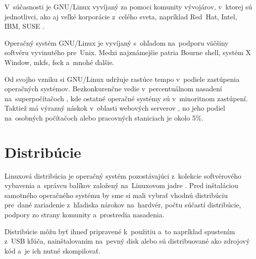V~súčasnosti je GNU/Linux vyvíjaný za pomoci komunity vývojárov, v~ktorej sú jednotlivci, ako aj veľké korporácie z~celého sveta, napríklad \mbox{Red Hat}, Intel, IBM, SUSE \cite{gnu}.

Operačný systém GNU/Linux je vyvíjaný s~ohľadom na~podporu väčšiny softvéru vyvinutého pre~Unix. Medzi najznámejšie patria Bourne shell, systém X Window, mkfs, fsck a~mnohé ďalšie.

Od svojho vzniku si GNU/Linux udržuje rastúce tempo v~podiele zastúpenia operačných systémov. Bezkonkurenčne vedie v~percentuálnom nasadení na~superpočítačoch \cite{marketsharesupercomputers}, kde ostatné operačné systémy sú v~minoritnom zastúpení. Taktiež má výrazný náskok v~oblasti webových serverov \cite{marketshareservers}, no jeho podiel na~osobných počítačoch alebo pracovných staniciach je okolo 5\%.

\section{Distribúcie}
Linuxová distribúcia je operačný systém pozostávajúci z~kolekcie softvérového vybavenia a~správcu balíkov založený na~Linuxovom jadre \cite{linux-distros}. Pred inštaláciou samotného operačného systému by sme si mali vybrať vhodnú distribúciu pre~dané zariadenie z~hľadiska nárokov na~hardvér, počtu súčastí distribúcie, podpory zo strany komunity a~prostredia nasadenia.

Distribúcie môžu byť ihneď pripravené k~použitiu a~to napríklad spustením z~USB kľúča, nainštalovaním na~pevný disk alebo sú distribuované ako zdrojový kód a~je ich nutné skompilovať.

